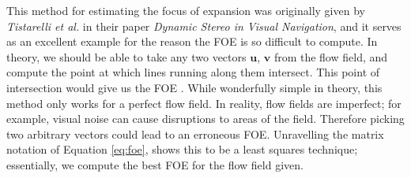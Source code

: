 \documentclass[a4paper,11pt,twoside,openright]{article}
\begin{document}
This method for estimating the focus of expansion was originally given
by \textit{Tistarelli et al.} in their paper \textit{Dynamic Stereo in
  Visual Navigation}\cite{Tistarelli1991, ODonovan2005}, and it serves
as an excellent example for the reason the FOE is so difficult to
compute. In theory, we should be able to take any two vectors
$\mathbf{u}$, $\mathbf{v}$ from the flow field, and compute the point
at which lines running along them intersect. This point of
intersection would give us the FOE \cite{ODonovan2005}. While
wonderfully simple in theory, this method only works for a perfect
flow field. In reality, flow fields are imperfect; for example, visual
noise can cause disruptions to areas of the field. Therefore picking
two arbitrary vectors could lead to an erroneous FOE. Unravelling the
matrix notation of Equation \ref{eq:foe}, shows this to be a least
squares technique; essentially, we compute the best FOE for the flow
field given.



\end{document}
